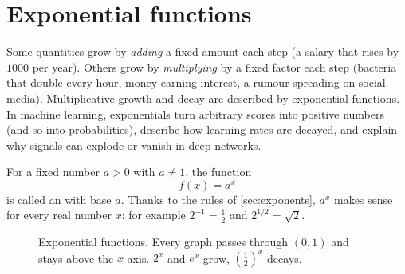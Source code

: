 \section{Exponential functions}\label{sec:exponential}

\begin{motivation}
Some quantities grow by \emph{adding} a fixed amount each step (a salary that
rises by $1000$ per year). Others grow by \emph{multiplying} by a fixed factor
each step (bacteria that double every hour, money earning interest, a rumour
spreading on social media). Multiplicative growth and decay are described by
exponential functions. In machine learning, exponentials turn arbitrary scores
into positive numbers (and so into probabilities), describe how learning rates
are decayed, and explain why signals can explode or vanish in deep networks.
\end{motivation}

\begin{definition}\label{def:exponential}
For a fixed number $a > 0$ with $a \neq 1$, the function
\[
  f(x) = a^x
\]
is called an  with base $a$. Thanks to the rules of
\cref{sec:exponents}, $a^x$ makes sense for every real number $x$: for
example $2^{-1} = \tfrac12$ and $2^{1/2} = \sqrt2$.
\end{definition}

\begin{figure}[htbp]
\centering
{}
\caption{Exponential functions. Every graph passes through $(0, 1)$ and stays
  above the $x$-axis. $2^x$ and $e^x$ grow, $(\tfrac12)^x$ decays.}
\label{fig:exponentials}
\end{figure}


